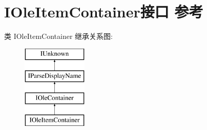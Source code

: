 \hypertarget{interface_i_ole_item_container}{}\section{I\+Ole\+Item\+Container接口 参考}
\label{interface_i_ole_item_container}
类 I\+Ole\+Item\+Container 继承关系图\+:\begin{figure}[H]
\begin{center}
\leavevmode
\includegraphics[height=4.000000cm]{interface_i_ole_item_container}
\end{center}
\end{figure}
